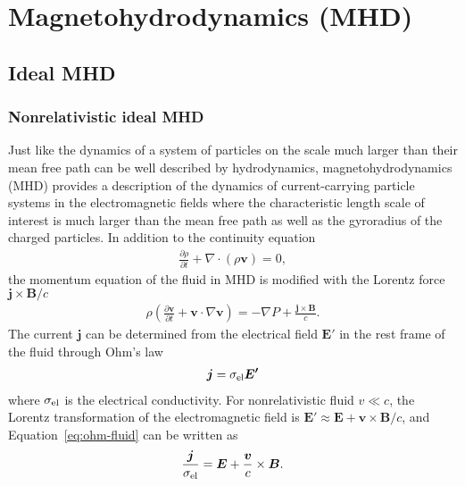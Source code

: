 
\chapter{Magnetohydrodynamics (MHD)}
\label{chap:mhd}

\section{Ideal MHD}
\label{sec:ideal}

\subsection{Nonrelativistic ideal MHD}
Just like the dynamics of a system of particles on the scale much larger than their mean free path can be well described by hydrodynamics, magnetohydrodynamics (MHD) provides a description of the dynamics of current-carrying particle systems in the electromagnetic fields where the characteristic length scale of interest is much larger than the mean free path as well as the gyroradius of the charged particles.
In addition to the continuity equation
\begin{eqnarray}\label{eq:mhd-continuity}
	\frac{\partial \rho}{\partial t} + \nabla \cdot (\rho \boldsymbol{v})=0,
\end{eqnarray}
the momentum equation of the fluid in MHD is modified with the Lorentz force $\boldsymbol{j}\times \boldsymbol{B}/c$
\begin{eqnarray}\label{eq:mhd-vel}
	\rho \left(\frac{\partial \boldsymbol{v}}{\partial t} + \boldsymbol{v}\cdot \nabla \boldsymbol{v}\right) = -\nabla P +\frac{ \boldsymbol{j}\times \boldsymbol{B}}{c}.
\end{eqnarray}
The current $\boldsymbol{j}$ can be determined from the electrical field $\boldsymbol{E'}$ in the rest frame of the fluid through Ohm's law
\begin{eqnarray}\label{eq:ohm-fluid}
	\boldsymbol{j} = \sigma_{\rm el} \boldsymbol{E'}
\end{eqnarray}
where $\sigma_{\rm el}$ is the electrical conductivity.
For nonrelativistic fluid $v\ll c$, the Lorentz transformation of the electromagnetic field is $\boldsymbol{E'} \approx \boldsymbol{E} + \boldsymbol{v}\times \boldsymbol{B}/c$, and Equation~\ref{eq:ohm-fluid} can be written as 
\begin{eqnarray}\label{eq:mhd-j}
	\frac{\boldsymbol{j}}{\sigma_{\rm el}} = \boldsymbol{E} +\frac{ \boldsymbol{v}}{c}\times \boldsymbol{B}.
\end{eqnarray}
